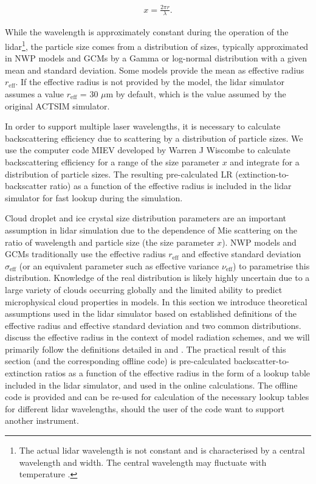 \begin{align}
x = \frac{2\pi r}{\lambda} .
\end{align}

While the wavelength is approximately constant during the operation of the lidar\footnote{The actual lidar wavelength is not constant and is characterised
by a central wavelength and width. The central wavelength may fluctuate with
temperature \citep{wiegner2015}.},
the particle size comes from a distribution of sizes, typically approximated
in NWP models and GCMs by a Gamma or log-normal distribution with a given mean
and standard deviation. Some models provide the mean as effective radius $r_\text{eff}$.
If the effective radius is not provided by the model, the lidar simulator
assumes a value $r_\text{eff}$ = 30 $\mu$m by default, which is the value assumed by the original ACTSIM
simulator.

In order to support multiple laser wavelengths, it is necessary
to calculate backscattering efficiency due to scattering by a distribution
of particle sizes. We use the computer code MIEV developed by Warren J Wiscombe
\citep{wiscombe1979,wiscombe1980} to
calculate backscattering efficiency for a range of the size parameter
$x$ and integrate for a distribution of particle sizes. The resulting
pre-calculated LR (extinction-to-backscatter ratio) as a function
of the effective radius is included in the lidar simulator for fast lookup
during the simulation.

Cloud droplet and ice crystal size distribution parameters are an important assumption
in lidar simulation due to the dependence of Mie scattering on the ratio of
wavelength and particle size (the size parameter $x$). NWP models and GCMs
traditionally use the effective radius $r_\text{eff}$ and effective standard
deviation $\sigma_\text{eff}$ (or an equivalent parameter such as effective variance $\nu_\text{eff}$)
 to parametrise this distribution. Knowledge of the real distribution is likely highly
uncertain due to a large variety of clouds occurring globally and the limited
ability to predict microphysical cloud properties in models. In this section
we introduce theoretical assumptions used in the lidar simulator based on established
definitions of the effective radius and effective standard deviation and two
common distributions.
\cite{edwards1996} discuss the effective radius in the context of model radiation
schemes, and we will primarily follow the definitions detailed in \cite{chang2001} and
\cite{petty2011}. The practical result of this section (and the corresponding
offline code) is pre-calculated backscatter-to-extinction ratios as a function of
the effective radius in the form of a lookup table included in the lidar
simulator, and used in the online calculations. The offline code
is provided and can be re-used for calculation of the necessary lookup tables for
different lidar wavelengths, should the user of the code want to support another
instrument.

